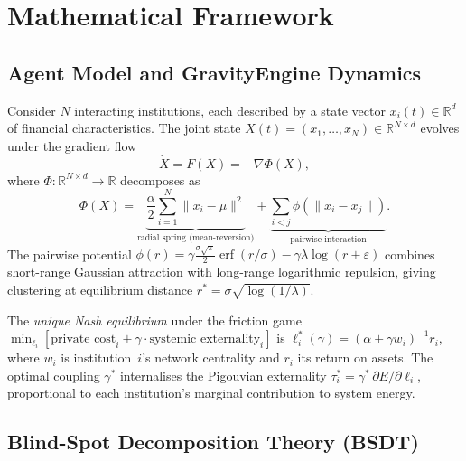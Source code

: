 \documentclass[final]{siamltex}
\newcommand{\R}{\mathbb{R}}
\newcommand{\norm}[1]{\lVert #1 \rVert}
\providecommand{\grad}{\nabla}
\DeclareMathOperator{\erf}{erf}
\begin{document}
\section{Mathematical Framework}\label{sec:model}

\subsection{Agent Model and GravityEngine Dynamics}\label{sec:agents}

Consider $N$ interacting institutions, each described by a state
vector $x_i(t)\in\R^d$ of financial characteristics. The joint
state $X(t)=(x_1,\ldots,x_N)\in\R^{N\times d}$ evolves under the
gradient flow
\begin{equation}\label{eq:gradflow}
  \dot{X} = F(X) = -\grad\Phi(X),
\end{equation}
where $\Phi:\R^{N\times d}\to\R$ decomposes as
\begin{equation}\label{eq:potential}
  \Phi(X) = \underbrace{\frac{\alpha}{2}\sum_{i=1}^{N}
  \norm{x_i-\mu}^2}_{\text{radial spring (mean-reversion)}}
  + \underbrace{\sum_{i<j}\phi(\norm{x_i-x_j})}_{\text{pairwise
  interaction}}.
\end{equation}
The pairwise potential $\phi(r)=\gamma\frac{\sigma\sqrt{\pi}}{2}
\erf(r/\sigma)-\gamma\lambda\log(r+\varepsilon)$ combines
short-range Gaussian attraction with long-range logarithmic
repulsion, giving clustering at equilibrium distance $r^*=
\sigma\sqrt{\log(1/\lambda)}$.

The \emph{unique Nash equilibrium} under the friction game
$\min_{\ell_i}[\text{private cost}_i+\gamma\cdot
\text{systemic externality}_i]$ is $\ell_i^*(\gamma)=
(\alpha+\gamma w_i)^{-1}r_i$, where $w_i$ is institution~$i$'s
network centrality and $r_i$ its return on assets.
The optimal coupling $\gamma^*$ internalises the Pigouvian
externality $\tau_i^*=\gamma^*\,\partial E/\partial\ell_i$,
proportional to each institution's marginal contribution to system
energy.

\subsection{Blind-Spot Decomposition Theory (BSDT)}\label{sec:bsdt}
\end{document}
